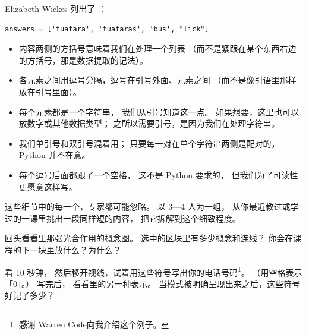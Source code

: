 
Elizabeth Wickes 列出了
：

\begin{verbatim}
answers = ['tuatara', 'tuataras', 'bus', "lick"]
\end{verbatim}

\begin{itemize}

\item
  内容两侧的方括号意味着我们在处理一个列表
  （而不是紧跟在某个东西右边的方括号，那是数据提取的记法）。

\item
  各元素之间用逗号分隔，逗号在引号外面、元素之间
  （而不是像引语里那样放在引号里面）。

\item
  每个元素都是一个字符串，
  我们从引号知道这一点。
  如果想要，这里也可以放数字或其他数据类型；
  之所以需要引号，是因为我们在处理字符串。

\item
  我们单引号和双引号混着用；
  只要每一对在单个字符串两侧是配对的，Python 并不在意。

\item
  每个逗号后面都跟了一个空格，
  这不是 Python 要求的，
  但我们为了可读性更愿意这样写。

\end{itemize}

这些细节中的每一个，专家都可能忽略。
以 3—4 人为一组，
从你最近教过或学过的一课里挑出一段同样短的内容，
把它拆解到这个细致程度。


回头看看里那张光合作用的概念图。
选中的区块里有多少概念和连线？
你会在课程的下一块里放什么？为什么？


看 10 秒钟，
然后移开视线，试着用这些符号写出你的电话号码\footnote{
  感谢 Warren Code向我介绍这个例子。
}。
（用空格表示「0」。）
写完后，
看看里的另一种表示。
当模式被明确呈现出来之后，这些符号好记了多少？

